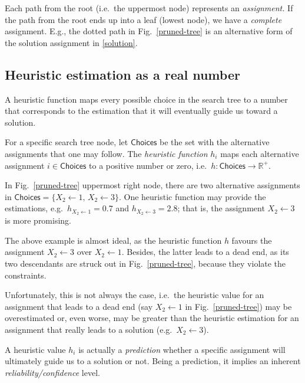 \documentclass{ws-ijait}
\begin{document}
Each path from the root (i.e.\ the uppermost node)
represents an \emph{assignment.} If the path from the root
ends up into a leaf (lowest node), we have a \emph{complete}
assignment. E.g., the dotted path in Fig.~\ref{pruned-tree}
is an alternative form of the solution assignment in
\eqref{solution}.

\subsection{Heuristic estimation as a real number}

A heuristic function maps every possible choice in the
search tree to a number that corresponds to the estimation
that it will eventually guide us toward a solution.
\begin{definition}
  For a specific search tree node, let $\mathsf{Choices}$ be
  the set with the alternative assignments that one may
  follow. The \emph{heuristic function} $h_i$ maps each
  alternative assignment $i \in \mathsf{Choices}$ to a
  positive number or zero, i.e.\ $h: \mathsf{Choices} \to
  \mathbb{R}^+$.
\end{definition}
\begin{example}
  In Fig.~\ref{pruned-tree} uppermost right node, there are
  two alternative assignments in $\mathsf{Choices} = \{ X_2
  \gets 1, \, X_2 \gets 3 \}$. One heuristic function may
  provide the estimations, e.g.\ $h_{X_2 \gets 1} = 0.7$ and
  $h_{X_2 \gets 3} = 2.8$; that is, the assignment $X_2
  \gets 3$ is more promising.
\end{example}
The above example is almost ideal, as the heuristic function
$h$ favours the assignment $X_2 \gets 3$ over $X_2 \gets 1$.
Besides, the latter leads to a dead end, as its two
descendants are struck out in Fig.~\ref{pruned-tree},
because they violate the constraints.

Unfortunately, this is not always the case, i.e.\ the
heuristic value for an assignment that leads to a dead end
(say $X_2 \gets 1$ in Fig.~\ref{pruned-tree}) may be
overestimated or, even worse, may be greater than the
heuristic estimation for an assignment that really leads to
a solution (e.g.\ $X_2 \gets 3$).

A heuristic value $h_i$ is actually a \emph{prediction}
whether a specific assignment will ultimately guide us to a
solution or not. Being a prediction, it implies an inherent
\emph{reliability\slash confidence} level.
\end{document}
